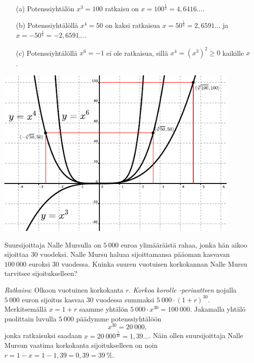 \begin{esimerkki}
\begin{enumerate}
\item[(a)]
Potenssiyhtälön $x^3 = 100$ ratkaisu on $x=100^{\frac{1}{3}}=4{,}6416...$.
\item[(b)]
Potenssiyhtälöllä $x^4=50$ on kaksi ratkaisua $x=50^{\frac{1}{4}}=2{,}6591...$ ja $x=-50^{\frac{1}{4}}=-2{,}6591...$.
\item[(c)] 
Potenssiyhtälöllä $x^6 = -1$ ei ole ratkaisua, sillä $x^4 = (x^3)^2 \ge 0$ kaikille $x$.
\end{enumerate}

\begin{center}
\includegraphics[width=12cm]{pictures/xpot346.pdf}
\end{center}
\end{esimerkki}


\begin{esimerkki}
Suursijoittaja Nalle Mursulla on $5~000$ euroa ylimääräistä rahaa, jonka hän aikoo sijoittaa $30$ vuodeksi.  Nalle Mursu haluaa sijoittamansa pääoman kasvavan $100~000$ euroksi $30$ vuodessa.  Kuinka suuren vuotuisen korkokannan Nalle Mursu tarvitsee sijoitukselleen? 

\emph{Ratkaisu}:  Olkoon vuotuinen korkokanta $r$. \emph{Korkoa korolle -periaatteen} nojalla $5~000$ euron sijoitus kasvaa $30$ vuodessa summaksi $5~000\cdot(1+r)^{30}$.  Merkitsemällä $x=1+r$ saamme yhtälön $5~000\cdot x^{30} = 100~000$.  Jakamalla yhtälö puolittain luvulla $5~000$ päädymme 
potenssiyhtälöön 
$$
x^{30} = 20~000,
$$ 
jonka ratkaisuksi saadaan $x=20~000^{\frac{1}{30}} = 1{,}39\ldots$. Näin
ollen suursijoittaja Nalle Mursun vaatima korkokanta sijoitukselleen on noin $r=1-x=1-1,39=0,39=39~\%$.
\end{esimerkki}

